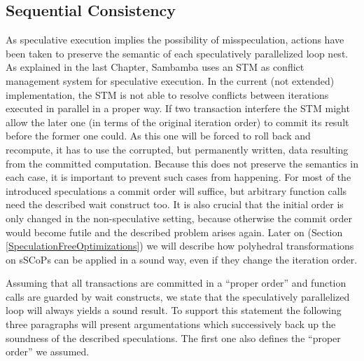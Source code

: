 \subsection{Sequential Consistency}
As speculative execution implies the possibility of misspeculation, actions have
been taken to preserve the semantic of each speculatively parallelized loop nest.
As explained in the last Chapter, Sambamba uses an STM as conflict management system 
for speculative execution. In the current (not extended) implementation, the STM 
is not able to resolve conflicts between iterations executed in parallel in a 
proper way. If two transaction interfere the STM might allow the later one
(in terms of the original iteration order) to commit its result before the 
former one could. As this one will be forced to roll back and recompute, 
it has to use the corrupted, but permanently written,
data resulting from the committed computation. Because this does not preserve the 
semantics in each case, it is important to prevent such cases from happening. For
most of the introduced speculations a commit order will suffice, but arbitrary 
function calls need the described wait construct too. It is also crucial that
the initial order is only changed in the non-speculative setting, because otherwise
the commit order would become futile and the described problem arises again.
Later on (Section \ref{SpeculationFreeOptimizations}) we will describe how
polyhedral transformations on sSCoPs can be applied in a sound way, 
even if they change the iteration order. 

Assuming that all transactions are committed in a ``proper order'' and function 
calls are guarded by wait constructs,
we state that the speculatively parallelized loop will always yields a
sound result. To support this statement the following three paragraphs will
present argumentations which successively back up the soundness of the described 
speculations. The first one also defines the ``proper order'' we assumed. 

